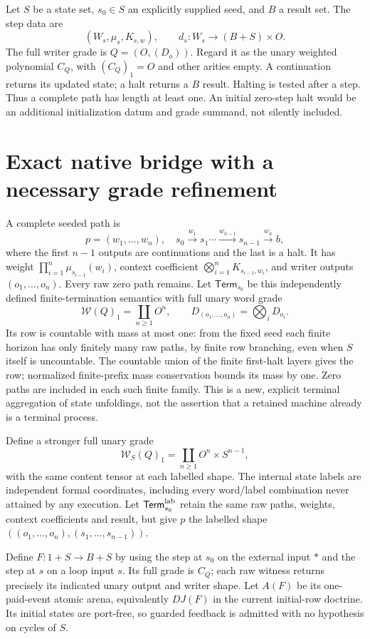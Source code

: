 \documentclass[11pt]{article}
\begin{document}
Let $S$ be a state set, $s_0\in S$ an explicitly supplied seed, and $B$ a result set. The step data are
\[
 (W_s,\mu_s,K_{s,w}),\qquad
 d_s:W_s\longrightarrow (B+S)\times O.
\]
The full writer grade is $Q=(O,(D_o))$. Regard it as the unary weighted polynomial $C_Q$, with $(C_Q)_1=O$ and other arities empty. A continuation returns its updated state; a halt returns a $B$ result. Halting is tested after a step. Thus a complete path has length at least one. An initial zero-step halt would be an additional initialization datum and grade summand, not silently included.

\section{Exact native bridge with a necessary grade refinement}
A complete seeded path is
\[
 p=(w_1,\ldots,w_n),\quad s_0\xrightarrow{w_1}s_1\cdots
 \xrightarrow{w_{n-1}}s_{n-1}\xrightarrow{w_n} b,
\]
where the first $n-1$ outputs are continuations and the last is a halt.
It has weight $\prod_{i=1}^n\mu_{s_{i-1}}(w_i)$, context coefficient
$\bigotimes_{i=1}^nK_{s_{i-1},w_i}$, and writer outputs $(o_1,\ldots,o_n)$.
Every raw zero path remains. Let $\mathsf{Term}_{s_0}$ be this independently defined finite-termination semantics with full unary word grade
\[
 \mathcal W(Q)_1=\coprod_{n\geq1}O^n,
 \qquad D_{(o_1,\ldots,o_n)}=\bigotimes_iD_{o_i}.
\]
Its row is countable with mass at most one: from the fixed seed each finite horizon has only finitely many raw paths, by finite row branching, even when $S$ itself is uncountable. The countable union of the finite first-halt layers gives the row; normalized finite-prefix mass conservation bounds its mass by one. Zero paths are included in each such finite family. This is a new, explicit terminal aggregation of state unfoldings, not the assertion that a retained machine already is a terminal process.

Define a stronger full unary grade
\[
 \mathcal W_S(Q)_1=\coprod_{n\geq1}O^n\times S^{n-1},        \tag{1}
\]
with the same content tensor at each labelled shape. The internal state labels are independent formal coordinates, including every word/label combination never attained by any execution. Let $\mathsf{Term}^{\rm lab}_{s_0}$ retain the same raw paths, weights, context coefficients and result, but give $p$ the labelled shape
$((o_1,\ldots,o_n),(s_1,\ldots,s_{n-1}))$.

Define $F:1+S\to B+S$ by using the step at $s_0$ on the external input $*$ and the step at $s$ on a loop input $s$. Its full grade is $C_Q$; each raw witness returns precisely its indicated unary output and writer shape. Let $A(F)$ be its one-paid-event atomic arena, equivalently $DJ(F)$ in the current initial-row doctrine. Its initial states are port-free, so guarded feedback is admitted with no hypothesis on cycles of $S$.
\end{document}
